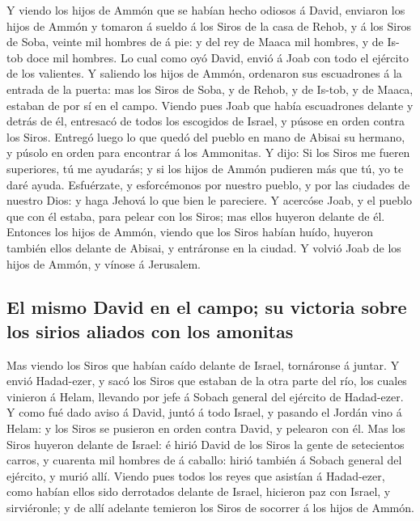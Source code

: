  Y viendo los hijos de Ammón que se habían hecho odiosos á
David, enviaron los hijos de Ammón y tomaron á sueldo á los Siros de la
casa de Rehob, y á los Siros de Soba, veinte mil hombres de á pie: y del
rey de Maaca mil hombres, y de Is-tob doce mil hombres.  Lo
cual como oyó David, envió á Joab con todo el ejército de los valientes.
 Y saliendo los hijos de Ammón, ordenaron sus escuadrones á
la entrada de la puerta: mas los Siros de Soba, y de Rehob, y de Is-tob,
y de Maaca, estaban de por sí en el campo.  Viendo pues Joab
que había escuadrones delante y detrás de él, entresacó de todos los
escogidos de Israel, y púsose en orden contra los Siros. 
Entregó luego lo que quedó del pueblo en mano de Abisai su hermano, y
púsolo en orden para encontrar á los Ammonitas.  Y dijo: Si
los Siros me fueren superiores, tú me ayudarás; y si los hijos de Ammón
pudieren más que tú, yo te daré ayuda.  Esfuérzate, y
esforcémonos por nuestro pueblo, y por las ciudades de nuestro Dios: y
haga Jehová lo que bien le pareciere.  Y acercóse Joab, y
el pueblo que con él estaba, para pelear con los Siros; mas ellos
huyeron delante de él.  Entonces los hijos de Ammón, viendo
que los Siros habían huído, huyeron también ellos delante de Abisai, y
entráronse en la ciudad. Y volvió Joab de los hijos de Ammón, y vínose á
Jerusalem.

\hypertarget{el-mismo-david-en-el-campo-su-victoria-sobre-los-sirios-aliados-con-los-amonitas}{%
\subsection{El mismo David en el campo; su victoria sobre los sirios
aliados con los
amonitas}\label{el-mismo-david-en-el-campo-su-victoria-sobre-los-sirios-aliados-con-los-amonitas}}

 Mas viendo los Siros que habían caído delante de Israel,
tornáronse á juntar.  Y envió Hadad-ezer, y sacó los Siros
que estaban de la otra parte del río, los cuales vinieron á Helam,
llevando por jefe á Sobach general del ejército de Hadad-ezer.
 Y como fué dado aviso á David, juntó á todo Israel, y
pasando el Jordán vino á Helam: y los Siros se pusieron en orden contra
David, y pelearon con él.  Mas los Siros huyeron delante de
Israel: é hirió David de los Siros la gente de setecientos carros, y
cuarenta mil hombres de á caballo: hirió también á Sobach general del
ejército, y murió allí.  Viendo pues todos los reyes que
asistían á Hadad-ezer, como habían ellos sido derrotados delante de
Israel, hicieron paz con Israel, y sirviéronle; y de allí adelante
temieron los Siros de socorrer á los hijos de Ammón.

